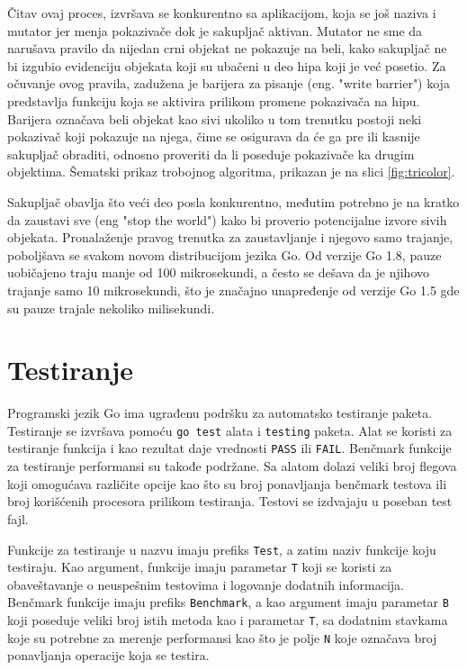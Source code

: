 \documentclass[12pt,oneside]{memoir}
\begin{document}
Čitav ovaj proces, izvršava se konkurentno sa aplikacijom, koja se još naziva i mutator jer menja pokazivače dok je sakupljač aktivan. Mutator ne sme da narušava pravilo da nijedan crni objekat ne pokazuje na beli, kako sakupljač ne bi izgubio evidenciju objekata koji su ubačeni u deo hipa koji je već posetio. Za očuvanje ovog pravila, zadužena je barijera za pisanje (eng. "write barrier") koja predstavlja funkciju koja se aktivira prilikom promene pokazivača na hipu. Barijera označava beli objekat kao sivi ukoliko u tom trenutku postoji neki pokazivač koji pokazuje na njega, čime se osigurava da će ga pre ili kasnije sakupljač obraditi, odnosno proveriti da li poseduje pokazivače ka drugim objektima. Šematski prikaz trobojnog algoritma, prikazan je na slici \ref{fig:tricolor}.

Sakupljač obavlja što veći deo posla konkurentno, međutim potrebno je na kratko da zaustavi sve (eng "stop the world") kako bi proverio potencijalne izvore sivih objekata. Pronalaženje pravog trenutka za zaustavljanje i njegovo samo trajanje, poboljšava se svakom novom distribucijom jezika Go. Od verzije Go 1.8, pauze uobičajeno traju manje od 100 mikrosekundi, a često se dešava da je njihovo trajanje samo 10 mikrosekundi, što je značajno unapređenje od verzije Go 1.5 gde su pauze trajale nekoliko milisekundi.

\section{Testiranje}

Programski jezik Go ima ugrađenu podršku za automatsko testiranje paketa. Testiranje se izvršava pomoću \texttt{go test} alata i \texttt{testing} paketa. Alat se koristi za testiranje funkcija i kao rezultat daje vrednosti \texttt{PASS} ili \texttt{FAIL}. Benčmark funkcije za testiranje performansi su takođe podržane. Sa alatom dolazi veliki broj flegova koji omogućava različite opcije kao što su broj ponavljanja benčmark testova ili broj korišćenih procesora prilikom testiranja. Testovi se izdvajaju u poseban test fajl. 

Funkcije za testiranje u nazvu imaju prefiks \texttt{Test}, a zatim naziv funkcije koju testiraju. Kao argument, funkcije imaju parametar \texttt{T} koji se koristi za obaveštavanje o neuspešnim testovima i logovanje dodatnih informacija. Benčmark funkcije imaju prefiks \texttt{Benchmark}, a kao argument imaju parametar \texttt{B} koji poseduje veliki broj istih metoda kao i parametar \texttt{T}, sa dodatnim stavkama koje su potrebne za merenje performansi kao što je polje \texttt{N} koje označava broj ponavljanja operacije koja se testira.
\end{document}
